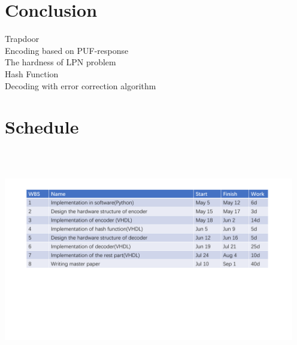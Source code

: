 \documentclass{beamer}
\begin{document}
\section{Conclusion}
\begin{outlineframe}
	\tableofcontents[currentsection]
\end{outlineframe}
\begin{frame}
Trapdoor\\
\vspace{0.3cm}
Encoding based on PUF-response\\
\vspace{0.3cm}
The hardness of LPN problem\\
\vspace{0.3cm}
Hash Function \\
\vspace{0.3cm}
Decoding with error correction algorithm\\
\end{frame}	


\section{Schedule}
\begin{outlineframe}
	\tableofcontents[currentsection]
\end{outlineframe}
\begin{frame}
	\vspace{0.3cm}
	\centering
	\includegraphics[width=5in,height=3.8in]{Schedule.pdf}
\end{frame}	
\end{document}
